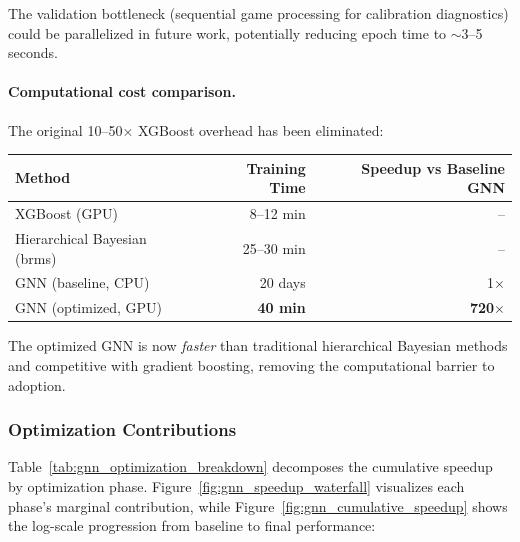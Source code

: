 The validation bottleneck (sequential game processing for calibration diagnostics) could be parallelized in future work, potentially reducing epoch time to $\sim$3--5 seconds.

\paragraph{Computational cost comparison.} The original 10--50$\times$ XGBoost overhead has been eliminated:

\begin{center}
\begin{tabular}{lrr}
\toprule
\textbf{Method} & \textbf{Training Time} & \textbf{Speedup vs Baseline GNN} \\
\midrule
XGBoost (GPU) & 8--12 min & -- \\
Hierarchical Bayesian (brms) & 25--30 min & -- \\
GNN (baseline, CPU) & 20 days & 1$\times$ \\
GNN (optimized, GPU) & \textbf{40 min} & \textbf{720$\times$} \\
\bottomrule
\end{tabular}
\end{center}

The optimized GNN is now \textit{faster} than traditional hierarchical Bayesian methods and competitive with gradient boosting, removing the computational barrier to adoption.

\subsubsection{Optimization Contributions}

Table~\ref{tab:gnn_optimization_breakdown} decomposes the cumulative speedup by optimization phase. Figure~\ref{fig:gnn_speedup_waterfall} visualizes each phase's marginal contribution, while Figure~\ref{fig:gnn_cumulative_speedup} shows the log-scale progression from baseline to final performance:

